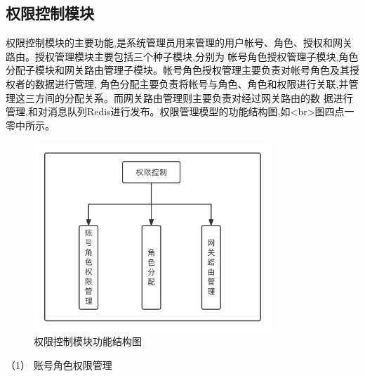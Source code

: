 \subsection{权限控制模块}


权限控制模块的主要功能,是系统管理员用来管理的用户帐号、角色、授权和网关路由。授权管理模块主要包括三个种子模块,分别为
帐号角色授权管理子模块,角色分配子模块和网关路由管理子模块。帐号角色授权管理主要负责对帐号角色及其授权者的数据进行管理,
角色分配主要负责将帐号与角色、角色和权限进行关联,并管理这三方间的分配关系。而网关路由管理则主要负责对经过网关路由的数
据进行管理,和对消息队列Redis进行发布。权限管理模型的功能结构图,如<br>图四点一零中所示。

\begin{figure}[htb]
    \centering
    \includegraphics[width=0.8\textwidth]{my_figures/chapter4/权限控制模块功能结构图.png}
    \caption{权限控制模块功能结构图}
    \label{fig:权限控制模块功能结构图}
\end{figure}

（1） 账号角色权限管理


